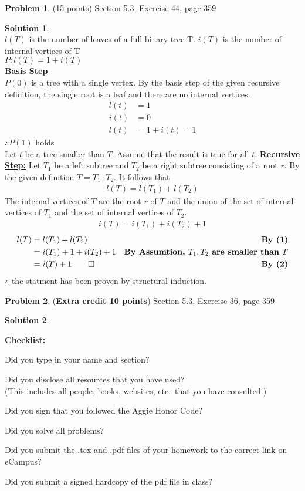 \documentclass{article}
\theoremstyle{definition}
\newtheorem{problem}{Problem}
\newtheorem*{solution}{Solution}
\newcommand{\checklist}{\noindent\textbf{Checklist:}
\begin{compactitem}[$\Box$] 
\item Did you type in your name and section? 
\item Did you disclose all resources that you have used? \\
(This includes all people, books, websites, etc.\ that you have consulted.)
\item Did you sign that you followed the Aggie Honor Code? 
\item Did you solve all problems? 
\item Did you submit the .tex and .pdf files of your homework to the correct link on eCampus?
\item Did you submit a signed hardcopy of the pdf file in class? 
\end{compactitem}
}
\begin{document}
\begin{problem} (15 points)
Section 5.3, Exercise 44, page 359
\end{problem}
\begin{solution} \ \\
$l(T)$ is the number of leaves of a full binary tree T.
$i(T )$ is the number of internal vertices of T \\
$P: l(T) = 1 + i(T)$ \\
\textbf{\underline{Basis Step}} \\
$P(0)$ is a tree with a single vertex. By the basis step of the given recursive definition, the single root is a leaf and there are no internal vertices.
\begin{align*}
  l(t) &= 1 \\
  i(t) &= 0 \\
  l(t) &= 1 + i(t) = 1
\end{align*}
$\therefore P(1)$ holds \\
Let $t$ be a tree smaller than $T$. Assume that the result is true for all $t$.
\textbf{\underline{Recursive Step:}}
Let $T_1$ be a left subtree and $T_2$ be a right subtree consisting of a root $r$. By the given definition $T = T_1 \cdot T_2$. It follows that
\begin{eqnarray}
  l(T) = l(T_1) + l(T_2)
\end{eqnarray}
The internal vertices of $T$ are the root $r$ of $T$ and the union of the
set of internal vertices of $T_1$ and the set of internal vertices
of $T_2$.
\begin{eqnarray}
  i(T) = i(T_1) + i(T_2) + 1
\end{eqnarray}
\begin{align*}
  l(T) &= l(T_1) + l(T_2) &\textbf{By (1)}\\
  &= i(T_1) + 1 + i(T_2) + 1 &\textbf{By Assumtion, $T_1,T_2$ are smaller than $T$}\\
  &= i(T) + 1 \qed &\textbf{By (2)}
\end{align*}
$\therefore$ the statment has been proven by structural induction.
\end{solution}

\begin{problem} (\textbf{Extra credit 10 points})
Section 5.3, Exercise 36, page 359
\end{problem}
\begin{solution} 
\end{solution}

\goodbreak
\checklist
\end{document}
